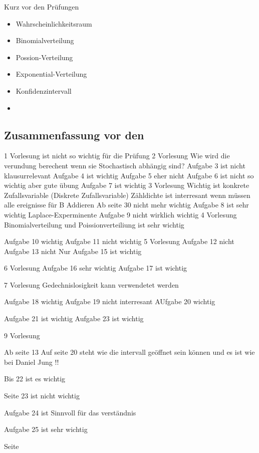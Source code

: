 Kurz vor den Prüfungen
\begin{itemize}
    \item Wahrscheinlichkeitsraum
    \item Binomialverteilung
    \item Possion-Verteilung
    \item Exponential-Verteilung
    \item Konfidenzintervall
    \item 
\end{itemize}
\subsection{Zusammenfassung vor den } 
1 Vorlesung ist nicht so wichtig für die Prüfung
2 Vorlesung Wie wird die verundung berechent wenn sie Stochastisch abhängig sind?
Aufgabe 3 ist nicht klausurrelevant 
Aufgabe 4 ist wichtig 
Aufgabe 5 eher nicht 
Aufgabe 6 ist nicht so wichtig aber gute übung 
Aufgabe 7 ist wichtig 
3 Vorlesung Wichtig ist konkrete Zufallsvariable (Diskrete Zufallsvariable) 
Zähldichte ist interresant wenn müssen alle ereignisse für B Addieren
Ab seite 30 nicht mehr wichtig
Aufgabe 8 ist sehr wichtig Laplace-Experminente
Aufgabe 9 nicht wirklich wichtig
4 Vorlesung Binomialverteilung und Poissionverteiliung ist sehr wichtig

Aufgabe 10 wichtig
Aufgabe 11 nicht wichtig
5 Vorlesung
Aufgabe 12 nicht
Aufgabe 13 nicht
Nur Aufgabe 15 ist wichtig

6 Vorlesung
Aufgabe 16 sehr wichtig
Aufgabe 17 ist wichtig

7 Vorlesung Gedechnislosigkeit kann verwendetet werden 

Aufgabe 18 wichtig
Aufgabe 19 nicht interresant
AUfgabe 20 wichtig

Aufgabe 21 ist wichtig
Aufgabe 23 ist wichtig

9 Vorlesung

Ab seite 13
Auf seite 20 steht wie die intervall geöffnet sein können und es ist wie bei Daniel Jung !!

Bis 22 ist es wichtig

Seite 23 ist nicht wichtig

Aufgabe 24 ist Sinnvoll für das verständnis

Aufgabe 25 ist sehr wichtig

   

Seite 